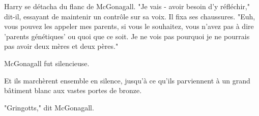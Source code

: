 Harry se détacha du flanc de McGonagall. "Je vais - avoir besoin d'y réfléchir," dit-il, essayant de maintenir un contrôle sur sa voix. Il fixa ses chaussures. "Euh, vous pouvez les appeler mes parents, si vous le souhaitez, vous n'avez pas à dire 'parents génétiques' ou quoi que ce soit. Je ne vois pas pourquoi je ne pourrais pas avoir deux mères et deux pères."

McGonagall fut silencieuse.

Et ils marchèrent ensemble en silence, jusqu'à ce qu'ils parviennent à un grand bâtiment blanc aux vastes portes de bronze.

"Gringotts," dit McGonagall.

